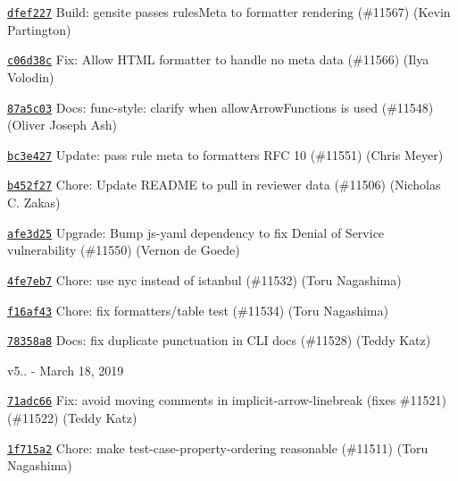 \begin{DoxyItemize}
\item \href{https://github.com/eslint/eslint/commit/dfef227091955a2f8f3fa8c76ad79de8a77e7955}{\texttt{ {\ttfamily dfef227}}} Build\+: gensite passes rules\+Meta to formatter rendering (\#11567) (Kevin Partington)
\item \href{https://github.com/eslint/eslint/commit/c06d38c81bd9203c904587396a65d3c8cc7f2944}{\texttt{ {\ttfamily c06d38c}}} Fix\+: Allow H\+T\+ML formatter to handle no meta data (\#11566) (Ilya Volodin)
\item \href{https://github.com/eslint/eslint/commit/87a5c034977cf4538ff3539d2f8776a987c5942a}{\texttt{ {\ttfamily 87a5c03}}} Docs\+: {\ttfamily func-\/style}\+: clarify when {\ttfamily allow\+Arrow\+Functions} is used (\#11548) (Oliver Joseph Ash)
\item \href{https://github.com/eslint/eslint/commit/bc3e427ee8875c53eac6b6762884b50074f1adfc}{\texttt{ {\ttfamily bc3e427}}} Update\+: pass rule meta to formatters R\+FC 10 (\#11551) (Chris Meyer)
\item \href{https://github.com/eslint/eslint/commit/b452f270bc0b523d88d5d827c95be3096f82e99d}{\texttt{ {\ttfamily b452f27}}} Chore\+: Update R\+E\+A\+D\+ME to pull in reviewer data (\#11506) (Nicholas C. Zakas)
\item \href{https://github.com/eslint/eslint/commit/afe3d25f8afb88caee43f7202d0eb96f33a92a6b}{\texttt{ {\ttfamily afe3d25}}} Upgrade\+: Bump js-\/yaml dependency to fix Denial of Service vulnerability (\#11550) (Vernon de Goede)
\item \href{https://github.com/eslint/eslint/commit/4fe7eb7cecdc2395cf1eeaa20921bda8460b00c2}{\texttt{ {\ttfamily 4fe7eb7}}} Chore\+: use nyc instead of istanbul (\#11532) (Toru Nagashima)
\item \href{https://github.com/eslint/eslint/commit/f16af439694aab473c647d8fae47c402bd489447}{\texttt{ {\ttfamily f16af43}}} Chore\+: fix formatters/table test (\#11534) (Toru Nagashima)
\item \href{https://github.com/eslint/eslint/commit/78358a8f66e95c4fcc921f2497e8a5ec5f1537ec}{\texttt{ {\ttfamily 78358a8}}} Docs\+: fix duplicate punctuation in C\+LI docs (\#11528) (Teddy Katz)
\end{DoxyItemize}

v5.. -\/ March 18, 2019


\begin{DoxyItemize}
\item \href{https://github.com/eslint/eslint/commit/71adc665b9649b173adc76f80723b8de20664ae1}{\texttt{ {\ttfamily 71adc66}}} Fix\+: avoid moving comments in implicit-\/arrow-\/linebreak (fixes \#11521) (\#11522) (Teddy Katz)
\item \href{https://github.com/eslint/eslint/commit/1f715a20c145d8ccc38f3310afccd838495d09d4}{\texttt{ {\ttfamily 1f715a2}}} Chore\+: make test-\/case-\/property-\/ordering reasonable (\#11511) (Toru Nagashima)
\end{DoxyItemize}

